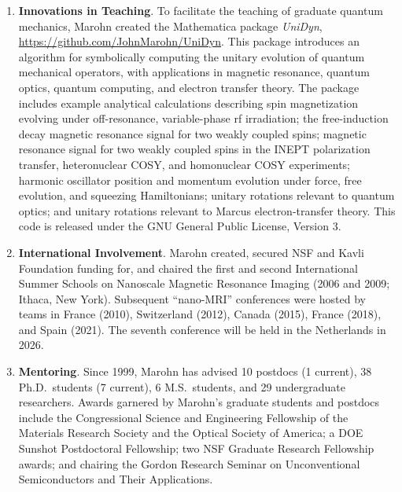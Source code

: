 \documentclass{NSF}
\begin{document}
\begin{enumerate}
\item {\bf Innovations in Teaching}.
To facilitate the teaching of graduate quantum mechanics, Marohn created the Mathematica package \emph{UniDyn}, \url{https://github.com/JohnMarohn/UniDyn}.  
This package introduces an algorithm for symbolically computing the unitary evolution of quantum mechanical operators, with applications in magnetic resonance, quantum optics, quantum computing, and electron transfer theory. 
The package includes example analytical calculations describing
spin magnetization evolving under off-resonance, variable-phase rf irradiation; 
the free-induction decay magnetic resonance signal for two weakly coupled spins; 
magnetic resonance signal for two weakly coupled spins in the INEPT polarization transfer, heteronuclear COSY, and homonuclear COSY experiments; 
harmonic oscillator position and momentum evolution under force, free evolution, and squeezing Hamiltonians; 
unitary rotations relevant to quantum optics; and 
unitary rotations relevant to Marcus electron-transfer theory.
This code is released under the GNU General Public License, Version 3.

\item {\bf International Involvement}.
Marohn created, secured NSF and Kavli Foundation funding for, and chaired the first and second International Summer Schools on Nanoscale Magnetic Resonance Imaging (2006 and 2009; Ithaca, New York).
Subsequent ``nano-MRI'' conferences were hosted by teams in France (2010), Switzerland (2012), Canada (2015), France (2018), and Spain (2021).
The seventh conference will be held in the Netherlands in 2026.

\item {\bf Mentoring}.
Since 1999, Marohn has advised 10 postdocs (1 current), 38 Ph.D.\ students (7 current),  6 M.S.\ students, and 29 undergraduate researchers.
Awards garnered by Marohn's graduate students and postdocs include
the Congressional Science and Engineering Fellowship of the Materials Research Society and the Optical Society of America; 
a DOE Sunshot Postdoctoral Fellowship; 
two NSF Graduate Research Fellowship awards; and
chairing the Gordon Research Seminar on Unconventional Semiconductors and Their Applications.

\end{enumerate}
\end{document}
